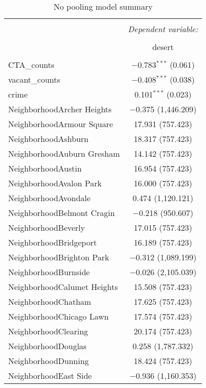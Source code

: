 \documentclass{report}
\begin{document}
\begin{table}[!htbp] \centering 
  \caption{No pooling model summary} 
  \label{npresult} 
\begin{tabular}{@{\extracolsep{5pt}}lc} 
\\[-1.8ex]\hline 
\hline \\[-1.8ex] 
 & \multicolumn{1}{c}{\textit{Dependent variable:}} \\ 
\cline{2-2} 
\\[-1.8ex] & desert \\ 
\hline \\[-1.8ex] 
 CTA\_counts & $-$0.783$^{***}$ (0.061) \\ 
 vacant\_counts & $-$0.408$^{***}$ (0.038) \\ 
 crime & 0.101$^{***}$ (0.023) \\ 
 NeighborhoodArcher Heights & $-$0.375 (1,446.209) \\ 
 NeighborhoodArmour Square & 17.931 (757.423) \\ 
 NeighborhoodAshburn & 18.317 (757.423) \\ 
 NeighborhoodAuburn Gresham & 14.142 (757.423) \\ 
 NeighborhoodAustin & 16.954 (757.423) \\ 
 NeighborhoodAvalon Park & 16.000 (757.423) \\ 
 NeighborhoodAvondale & 0.474 (1,120.121) \\ 
 NeighborhoodBelmont Cragin & $-$0.218 (950.607) \\ 
 NeighborhoodBeverly & 17.015 (757.423) \\ 
 NeighborhoodBridgeport & 16.189 (757.423) \\ 
 NeighborhoodBrighton Park & $-$0.312 (1,089.199) \\ 
 NeighborhoodBurnside & $-$0.026 (2,105.039) \\ 
 NeighborhoodCalumet Heights & 15.508 (757.423) \\ 
 NeighborhoodChatham & 17.625 (757.423) \\ 
 NeighborhoodChicago Lawn & 17.574 (757.423) \\ 
 NeighborhoodClearing & 20.174 (757.423) \\ 
 NeighborhoodDouglas & 0.258 (1,787.332) \\ 
 NeighborhoodDunning & 18.424 (757.423) \\ 
 NeighborhoodEast Side & $-$0.936 (1,160.353) \\ 

\end{tabular}
\end{table}
\end{document}
